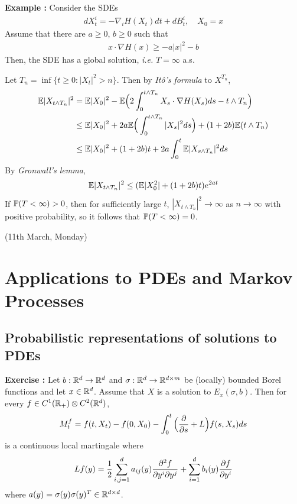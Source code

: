 \documentclass[12pt,a4paper]{article}
\newenvironment{proof}
{\begin{changemargin}{0.5cm}{0.5cm} 
	}%
	{\end{changemargin}
}
\newenvironment{p}
{\begin{proof} 
	}%
	{\end{proof}
}
\begin{document}
\textbf{Example :} Consider the SDEs
\begin{align*}
dX_t^i = -\nabla_i H(X_t) dt + dB_t^i, \quad X_0 =x
\end{align*}
Assume that there are $a\geq 0$, $b\geq 0$ such that
\begin{align*}
x\cdot \nabla H(x) \geq - a|x|^2 -b
\end{align*}
Then, the SDE has a global solution, \textit{i.e.} $T=\infty$ a.s.
\begin{p}
\pf Let $T_n = \inf \{t\geq 0 : |X_t|^2 >n \}$. Then by \emph{It\^o's formula} to $X^{T_n}$,
\begin{align*}
\mathbb{E} |X_{t\wedge T_n}|^2 & = \mathbb{E} |X_0|^2 - \mathbb{E} \Big( 2 \int_0^{t\wedge T_n} X_s \cdot \nabla H(X_s) ds - t\wedge T_n \Big) \\
& \leq \mathbb{E} |X_0|^2 + 2a \mathbb{E} \Big( \int_0^{t\wedge T_n} |X_s|^2 ds \Big) + (1+ 2b) \mathbb{E} (t\wedge T_n) \\
& \leq \mathbb{E} |X_0|^2 + (1+2b)t + 2a\int_0^t \mathbb{E} |X_{s\wedge T_n}|^2 ds  
\end{align*}
By \emph{Gronwall's lemma},
\begin{align*}
\mathbb{E} |X_{t\wedge T_n}|^2 \leq (\mathbb{E} |X_0^2| + (1+2b)t) e^{2at}
\end{align*}
If $\mathbb{P}(T< \infty)>0$, then for sufficiently large $t$, $|X_{t\wedge T_n}|^2 \rightarrow \infty$ as $n\rightarrow \infty$ with positive probability, so it follows that $\mathbb{P}(T< \infty) =0$.

\eop
\end{p}
\s

\newday

(11th March, Monday)

\section{Applications to PDEs and Markov Processes}

\subsection{Probabilistic representations of solutions to PDEs}

\textbf{Exercise :} Let $b: \mathbb{R}^d \rightarrow \mathbb{R}^d$ and $\sigma : \mathbb{R}^d \rightarrow \mathbb{R}^{d\times m}$ be (locally) bounded Borel functions and let $x\in \mathbb{R}^d$. Assume that $X$ is a solution to $E_x(\sigma, b)$. Then for every $f\in C^1(\mathbb{R}_+) \otimes C^2(\mathbb{R}^d)$,
\begin{align*}
M_t^f = f(t, X_t) - f(0, X_0) - \int_0^t \Big( \frac{\partial}{\partial s} + L \Big) f(s, X_s) ds
\end{align*}
is a continuous local martingale where
\begin{align*}
Lf (y) = \frac{1}{2} \sum_{i,j=1}^d a_{ij}(y)\frac{\partial^2 f}{\partial y^i \partial y^j} + \sum_{i=1}^d b_i(y)\frac{\partial f}{\partial y^i}
\end{align*}
where $a(y) = \sigma (y)\sigma(y)^T \in \mathbb{R}^{d\times d}$.
\s
\end{document}
